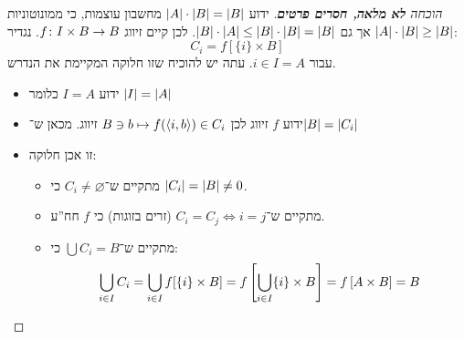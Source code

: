\documentclass[]{../../../../tex/classes/styledArticle}
\begin{document}
	\begin{proof}[הוכחה \textbf{לא מלאה, חסרים פרטים}]
		ידוע $\left \lvert A \right \rvert \cdot \left \lvert B \right \rvert = \left \lvert B \right \rvert$ מחשבון עוצמות, כי ממונוטוניות $\left \lvert A \right \rvert \cdot \left \lvert B \right \rvert \ge \left \lvert B \right \rvert$ אך גם $\left \lvert B \right \rvert \cdot \left \lvert A \right \rvert \le \left \lvert B \right \rvert \cdot \left \lvert B \right \rvert = \left \lvert B \right \rvert$. לכן קיים זיווג $f \colon I \times B \to B$. נגדיר:
		\[ C_i = f[\{i\} \times B] \]
		עבור $i \in I = A$. 
		עתה יש להוכיח שזו חלוקה המקיימת את הנדרש. 
		\begin{itemize}
			\item ידוע $I = A$ כלומר $\left \lvert I \right \rvert = \left \lvert A \right \rvert$
			\item ידוע $f$ זיווג לכן $B \ni b \mapsto f(\langle i, b\rangle) \in C_i$ זיווג. מכאן ש־$\left \lvert B \right \rvert = \left \lvert C_i \right \rvert$
			\item זו אכן חלוקה: 
			\begin{itemize}
				\item מתקיים ש־$C_i \neq \varnothing$ כי $\left \lvert C_i \right \rvert = \left \lvert B \right \rvert \neq 0$. 
				\item מתקיים ש־$C_i = C_j \iff i = j$ (זרים בזוגות) כי $f$ חח''ע. 
				\item מתקיים ש־$\bigcup C_i = B$ כי: 
				\[ \bigcup_{i \in I} C_i = \bigcup_{i \in I}f[\{i\} \times B] = f \left [ \bigcup_{i \in I} \{i\}\times B \right ] = f\left [ A \times B \right ] = B \]
			\end{itemize}
		\end{itemize}
	\end{proof}
	
\end{document}
